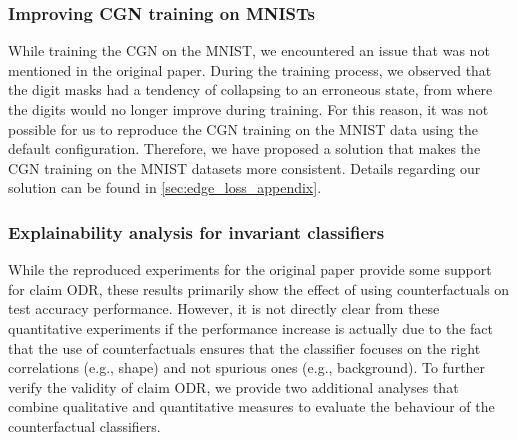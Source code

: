 \subsubsection{Improving CGN training on MNISTs}
\label{ssec:additional-mnist}
\label{para:training-cgn}
While training the CGN on the MNIST, we encountered an issue that was not mentioned in the original paper. During the training process, we observed that the digit masks had a tendency of collapsing to an erroneous state, from where the digits would no longer improve during training. For this reason, it was not possible for us to reproduce the CGN training on the MNIST data using the default configuration. Therefore, we have proposed a solution that makes the CGN training on the MNIST datasets more consistent. Details regarding our solution can be found in \cref{sec:edge_loss_appendix}.

\subsubsection{Explainability analysis for invariant classifiers} \label{ssec:explainability-analysis}
While the reproduced experiments for the original paper provide some support for claim ODR, these results primarily show the effect of using counterfactuals on test accuracy performance. However, it is not directly clear from these quantitative experiments if the performance increase is actually due to the fact that the use of counterfactuals ensures that the classifier focuses on the right correlations (e.g., shape) and not spurious ones (e.g., background). To further verify the validity of claim ODR, we provide two additional analyses that combine qualitative and quantitative measures to evaluate the behaviour of the counterfactual classifiers.

